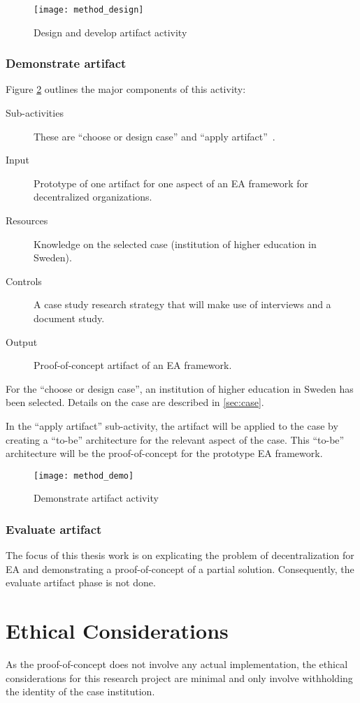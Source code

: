 \begin{figure}
\centering
\texttt{[image: method\_design]}
\caption{Design and develop artifact activity}
\label{fig:method_design}
\end{figure}
  
\subsubsection*{Demonstrate artifact}

Figure \ref{fig:method_demo} outlines the major components of this activity:
\begin{description}
  \item[Sub-activities]  These are ``choose or design case'' and ``apply artifact''~\cite[Ch. 8]{johannessonPerjons2012}.
  \item[Input]  Prototype of one artifact for one aspect of an EA framework for decentralized organizations. 
  \item[Resources]  Knowledge on the selected case (institution of higher education in Sweden). 
  \item[Controls]  A case study research strategy that will make use of interviews and a document study.
  \item[Output] Proof-of-concept artifact of an EA framework. 
\end{description}

For the ``choose or design case'', an institution of higher education in Sweden has been selected. Details on the case are described in \ref{sec:case}.

In the ``apply artifact'' sub-activity, the artifact will be applied to the case by creating a ``to-be'' architecture for the relevant aspect of the case. This ``to-be'' architecture will be the proof-of-concept for the prototype EA framework. 

\begin{figure}
\centering
\texttt{[image: method\_demo]}
\caption{Demonstrate artifact activity}
\label{fig:method_demo}
\end{figure}

\subsubsection*{Evaluate artifact}

The focus of this thesis work is on explicating the problem of decentralization for EA and demonstrating a proof-of-concept of a partial solution. Consequently, the evaluate artifact phase is not done. 

\section{Ethical Considerations}

As the proof-of-concept does not involve any actual implementation, the ethical considerations for this research project are minimal and only involve withholding the identity of the case institution. 
